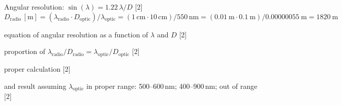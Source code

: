 Angular resolution: $\sin(\lambda) = 1.22\,\lambda/D$
\hfill[2]
\[
D_{\mathrm{radio}}\,[\mathrm{m}]
 = (\lambda_{\mathrm{radio}} \cdot D_{\mathrm{optic}})/\lambda_{\mathrm{optic}}
 = (1\,\mathrm{cm} \cdot 10\,\mathrm{cm})/550\,\mathrm{nm}
 = (0.01\ \mathrm{m} \cdot 0.1\ \mathrm{m})/0.00000055\ \mathrm{m}
 = 1820\ \mathrm{m}
\]

equation of angular resolution as a function of $\lambda$ and $D$ \hfill[2]

proportion of
$\lambda_{\mathrm{radio}}/D_{\mathrm{radio}}
 = \lambda_{\mathrm{optic}}/D_{\mathrm{optic}}$ \hfill[2]

proper calculation \hfill[2]

and result assuming $\lambda_{\mathrm{optic}}$ in proper range:
500--600\,nm; 400--900\,nm; out of range \hfill[2]
